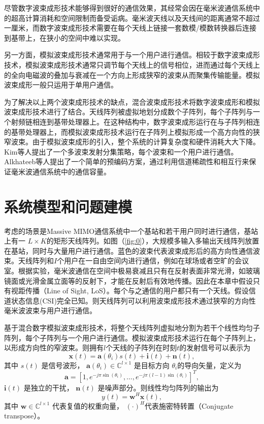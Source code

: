 尽管数字波束成形技术能够得到很好的通信效果，其经常会因在毫米波通信系统中的超高计算消耗和空间限制而备受诟病。毫米波天线以及天线间的距离通常不超过一厘米，而数字波束成形技术需要在每个天线上链接一套数模/模数转换器后连接到基带上，在狭小的空间中难以实现。

另一方面，模拟波束成形技术\cite{venkateswaran2010analog}通常用于与一个用户进行通信。相较于数字波束成形技术，模拟波束成形技术通常只调节每个天线上的信号相位，进而通过每个天线上的全向电磁波的叠加与衰减在一个方向上形成狭窄的波束从而聚集传输能量\cite{wang2009beam,sun2014mimo}。模拟波束成形一般只运用于单用户通信。

为了解决以上两个波束成形技术的缺点，混合波束成形技术\cite{han2015large,molisch2016hybrid}将数字波束成形和模拟波束成形技术进行了结合。天线阵列被虚拟地划分成数个子阵列\cite{huang2010hybrid}，每个子阵列与一个射频链相连到基带处理器上。在这种结构中，数字波束成形运行在与子阵列相连的基带处理器上，而模拟波束成形技术运行在子阵列上模拟形成一个高方向性的狭窄波束。由于模拟波束成形的引入，整个系统的计算复杂度和硬件消耗大大下降。Kim等人提出了一个多波束发射分集策略\cite{kim2013multi}，每个波束和一个用户进行通信。Alkhateeb等人提出了一个简单的预编码方案\cite{alkhateeb2013hybrid}，通过利用信道稀疏性和相互行来保证毫米波通信系统中的通信容量。

\section{系统模型和问题建模}

考虑的场景是Massive MIMO通信系统中一个基站和若干用户同时进行通信，基站上有一 $L \times K$的矩形天线阵列。如图（\ref{fig:0}），大规模多输入多输出天线阵列放置在基站，同时与大量用户进行通信。蓝色的波束代表波束成形后的高方向性通信波束。天线阵列和$I$个用户在一自由空间内进行通信，例如在球场或者空旷的会议室。根据实验，毫米波通信在空间中极易衰减且只有在反射表面非常光滑，如玻璃镜面或光滑金属立面等的反射下，才能在反射后有效地传播\cite{rappaport2013broadband,rappaport2013millimeter}。因此在本章中假设只有视距传播（Line of Sight, LoS）。每个与之通信的用户都只有一个天线。假设信道状态信息(CSI)完全已知。则天线阵列可以利用波束成形技术通过狭窄的方向性毫米波波束与用户进行通信。

基于混合数字模拟波束成形技术，将整个天线阵列虚拟地分割为若干个线性均匀子阵列，每个子阵列与一个用户进行通信。模拟波束成形技术运行在每个子阵列上，以形成方向性的窄波束。则拥有$l$个天线的子阵列在时刻$t$的发射信号可以表示为
\begin{equation}
\mathbf{x}(t) = \mathbf{a} (\theta_i) s(t) + \mathbf{i}(t) +\mathbf{n}(t),
\end{equation}
其中 $s(t)$ 是信号波形， $\mathbf{a}(\theta_i)\in \mathbb{C}^{l \times 1}$ 是目标方向 $\theta_i$的导向矢量，定义为
\begin{equation}
\mathbf{a} = [1,e^{-j\pi \sin(\theta_i)},\dots,e^{-j\pi (l-1) \sin(\theta_i)}]^T,
\end{equation}
 $\mathbf{i}(t)$ 是独立的干扰， $\mathbf{n}(t)$ 是噪声部分。则线性均匀阵列的输出为
\begin{equation}
y(t)=\mathbf{w}^H\mathbf{x}(t),
\end{equation}
其中 $\mathbf{w} \in \mathbb{C}^{l \times 1}$ 代表复值的权重向量， $(\cdot)^H$代表施密特转置（Conjugate transpose）。

